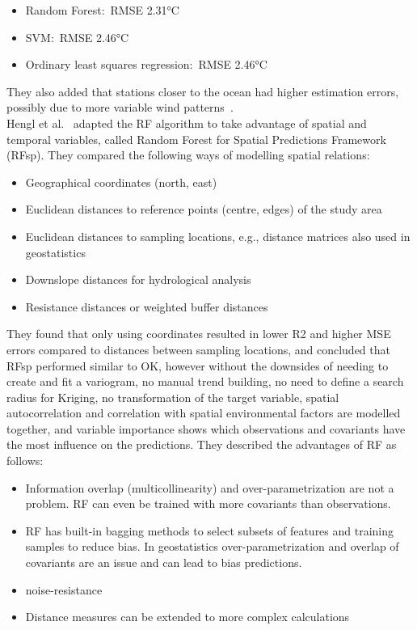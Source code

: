 \begin{itemize}
    \item Random Forest:\ RMSE 2.31°C
    \item SVM:\ RMSE 2.46°C
    \item Ordinary least squares regression:\ RMSE 2.46°C
\end{itemize}

They also added that stations closer to the ocean had higher estimation errors, possibly due to more variable wind patterns~\cite{runnalls2000dynamics}.\\
Hengl et al.~\cite{hengl2018random} adapted the RF algorithm to take advantage of spatial and temporal variables, called Random Forest for Spatial Predictions Framework (RFsp). They compared the following ways of modelling spatial relations:

\begin{itemize}
    \item Geographical coordinates (north, east)
    \item Euclidean distances to reference points (centre, edges) of the study area 
    \item Euclidean distances to sampling locations, e.g., distance matrices also used in geostatistics
    \item Downslope distances for hydrological analysis
    \item Resistance distances or weighted buffer distances
\end{itemize}

They found that only using coordinates resulted in lower R2 and higher MSE errors compared to distances between sampling locations, and concluded that RFsp performed similar to OK, however without the downsides of needing to create and fit a variogram, no manual trend building, no need to define a search radius for Kriging, no transformation of the target variable, spatial autocorrelation and correlation with spatial environmental factors are modelled together, and variable importance shows which observations and covariants have the most influence on the predictions. They described the advantages of RF as follows:

\begin{itemize}
    \item Information overlap (multicollinearity) and over-parametrization are not a problem. RF can even be trained with more covariants than observations.
    \item RF has built-in bagging methods to select subsets of features and training samples to reduce bias. In geostatistics over-parametrization and overlap of covariants are an issue and can lead to bias predictions.
    \item noise-resistance~\cite{strobl2007bias}
    \item Distance measures can be extended to more complex calculations
\end{itemize}

